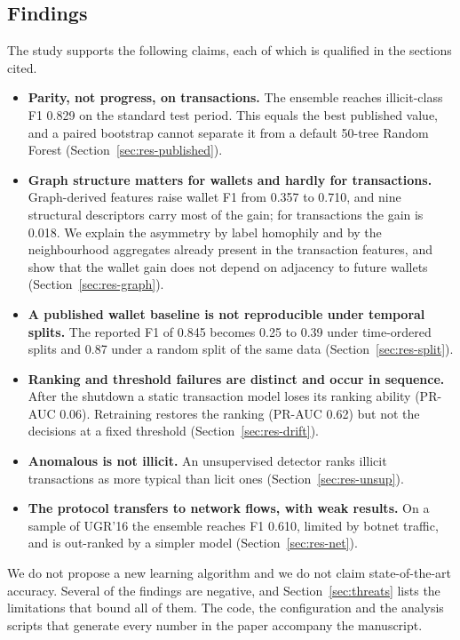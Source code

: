 \subsection{Findings}
The study supports the following claims, each of which is qualified in the sections cited.
\begin{itemize}
\item \textbf{Parity, not progress, on transactions.} The ensemble reaches illicit-class F1 0.829 on the standard test period. This equals the best published value, and a paired bootstrap cannot separate it from a default 50-tree Random Forest (Section~\ref{sec:res-published}).
\item \textbf{Graph structure matters for wallets and hardly for transactions.} Graph-derived features raise wallet F1 from 0.357 to 0.710, and nine structural descriptors carry most of the gain; for transactions the gain is 0.018. We explain the asymmetry by label homophily and by the neighbourhood aggregates already present in the transaction features, and show that the wallet gain does not depend on adjacency to future wallets (Section~\ref{sec:res-graph}).
\item \textbf{A published wallet baseline is not reproducible under temporal splits.} The reported F1 of 0.845 becomes 0.25 to 0.39 under time-ordered splits and 0.87 under a random split of the same data (Section~\ref{sec:res-split}).
\item \textbf{Ranking and threshold failures are distinct and occur in sequence.} After the shutdown a static transaction model loses its ranking ability (PR-AUC 0.06). Retraining restores the ranking (PR-AUC 0.62) but not the decisions at a fixed threshold (Section~\ref{sec:res-drift}).
\item \textbf{Anomalous is not illicit.} An unsupervised detector ranks illicit transactions as more typical than licit ones (Section~\ref{sec:res-unsup}).
\item \textbf{The protocol transfers to network flows, with weak results.} On a sample of UGR'16 the ensemble reaches F1 0.610, limited by botnet traffic, and is out-ranked by a simpler model (Section~\ref{sec:res-net}).
\end{itemize}
We do not propose a new learning algorithm and we do not claim state-of-the-art accuracy. Several of the findings are negative, and Section~\ref{sec:threats} lists the limitations that bound all of them. The code, the configuration and the analysis scripts that generate every number in the paper accompany the manuscript.

